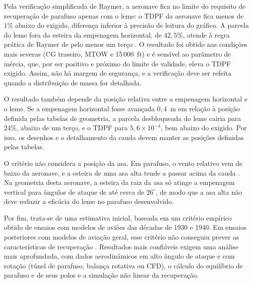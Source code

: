 Pela verificação simplificada de Raymer, a aeronave fica no limite do requisito de recuperação de parafuso apenas com o leme: o TDPF da aeronave fica menos de $1\%$ abaixo do exigido, diferença inferior à precisão de leitura do gráfico. A parcela do leme fora da esteira da empenagem horizontal, de $42{,}5\%$, atende à regra prática de Raymer de pelo menos um terço \cite{raymer2018}. O resultado foi obtido nas condições mais severas (CG traseiro, MTOW e 15\,000~ft) e é sensível ao parâmetro de inércia, que, por ser positivo e próximo do limite de validade, eleva o TDPF exigido. Assim, não há margem de segurança, e a verificação deve ser refeita quando a distribuição de massa for detalhada.

O resultado também depende da posição relativa entre a empenagem horizontal e o leme. Se a empenagem horizontal fosse avançada $0{,}4$~m em relação à posição definida pelas tabelas de geometria, a parcela desbloqueada do leme cairia para $24\%$, abaixo de um terço, e o TDPF para $5{,}6\times10^{-4}$, bem abaixo do exigido. Por isso, os desenhos e o detalhamento da cauda devem manter as posições definidas pelas tabelas.

O critério não considera a posição da asa. Em parafuso, o vento relativo vem de baixo da aeronave, e a esteira de uma asa alta tende a passar acima da cauda \cite{bowman1971}. Na geometria desta aeronave, a esteira da raiz da asa só atinge a empenagem vertical para ângulos de ataque de até cerca de $26^\circ$, de modo que a asa alta não deve reduzir a eficácia do leme no parafuso desenvolvido.

Por fim, trata-se de uma estimativa inicial, baseada em um critério empírico obtido de ensaios com modelos de aviões das décadas de 1930 e 1940. Em ensaios posteriores com modelos de aviação geral, esse critério não conseguiu prever as características de recuperação \cite{burk1977}. Resultados mais confiáveis exigem uma análise mais aprofundada, com dados aerodinâmicos em alto ângulo de ataque e com rotação (túnel de parafuso, balança rotativa ou CFD), o cálculo do equilíbrio de parafuso e de seus polos e a simulação não linear da recuperação.